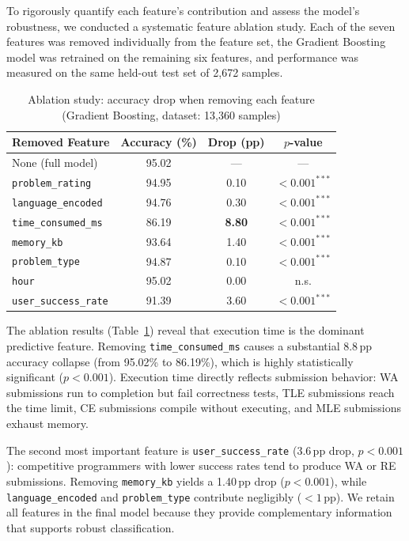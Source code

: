 \documentclass[10pt,a4paper]{article}
\begin{document}
To rigorously quantify each feature's contribution and assess the model's
robustness, we conducted a systematic feature ablation study. Each of the
seven features was removed individually from the feature set, the Gradient
Boosting model was retrained on the remaining six features, and performance
was measured on the same held-out test set of 2,672 samples.

\begin{table}[htbp]
\centering
\caption{Ablation study: accuracy drop when removing each feature
         (Gradient Boosting, dataset: 13,360 samples)}
\label{tab:ablation}
\begin{tabular}{@{}lccc@{}}
\toprule
Removed Feature & Accuracy (\%) & Drop (pp) & $p$-value \\
\midrule
None (full model)         & 95.02 & ---    & --- \\
\texttt{problem\_rating}    & 94.95 & 0.10   & $<0.001^{***}$ \\
\texttt{language\_encoded}& 94.76 & 0.30   & $<0.001^{***}$ \\
\texttt{time\_consumed\_ms}& 86.19 & \textbf{8.80} & $<0.001^{***}$ \\
\texttt{memory\_kb}        & 93.64 & 1.40   & $<0.001^{***}$ \\
\texttt{problem\_type}    & 94.87 & 0.10   & $<0.001^{***}$ \\
\texttt{hour}              & 95.02 & 0.00   & n.s. \\
\texttt{user\_success\_rate}& 91.39 & 3.60   & $<0.001^{***}$ \\
\bottomrule
\end{tabular}
\end{table}

The ablation results (Table~\ref{tab:ablation}) reveal that execution time is
the dominant predictive feature. Removing \texttt{time\_consumed\_ms} causes
a substantial 8.8\,pp accuracy collapse (from 95.02\% to 86.19\%), which is
highly statistically significant ($p < 0.001$). Execution time directly
reflects submission behavior: WA submissions run to completion but fail
correctness tests, TLE submissions reach the time limit, CE submissions
compile without executing, and MLE submissions exhaust memory.

The second most important feature is \texttt{user\_success\_rate} (3.6\,pp
drop, $p < 0.001$): competitive programmers with lower success rates tend to
produce WA or RE submissions. Removing \texttt{memory\_kb} yields a 1.40\,pp
drop ($p < 0.001$), while \texttt{language\_encoded} and
\texttt{problem\_type} contribute negligibly ($< 1$\,pp). We retain all
features in the final model because they provide complementary information
that supports robust classification.
\end{document}
